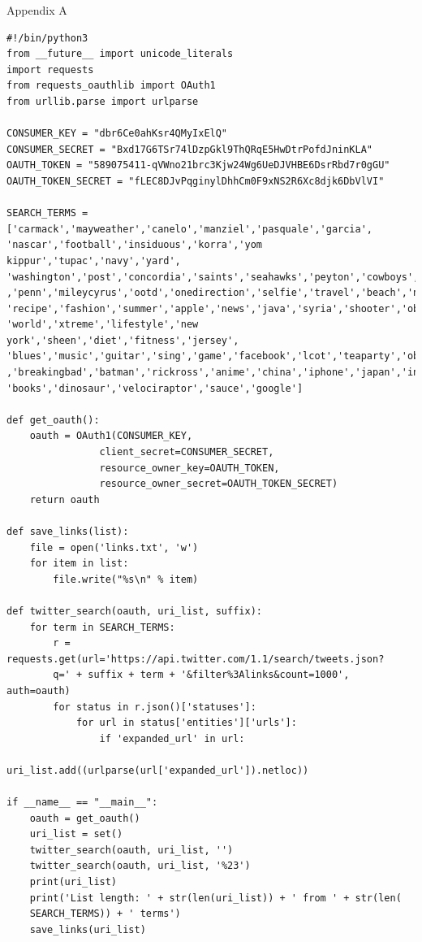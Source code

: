 \documentclass{article}
\begin{document}
\newpage
\appendix
Appendix A
\begin{verbatim}
#!/bin/python3
from __future__ import unicode_literals
import requests
from requests_oauthlib import OAuth1
from urllib.parse import urlparse

CONSUMER_KEY = "dbr6Ce0ahKsr4QMyIxElQ"
CONSUMER_SECRET = "Bxd17G6TSr74lDzpGkl9ThQRqE5HwDtrPofdJninKLA"
OAUTH_TOKEN = "589075411-qVWno21brc3Kjw24Wg6UeDJVHBE6DsrRbd7r0gGU"
OAUTH_TOKEN_SECRET = "fLEC8DJvPqginylDhhCm0F9xNS2R6Xc8djk6DbVlVI"

SEARCH_TERMS = ['carmack','mayweather','canelo','manziel','pasquale','garcia',
'nascar','football','insiduous','korra','yom kippur','tupac','navy','yard',
'washington','post','concordia','saints','seahawks','peyton','cowboys','eagles'
,'penn','mileycyrus','ootd','onedirection','selfie','travel','beach','nerd',
'recipe','fashion','summer','apple','news','java','syria','shooter','obama',
'world','xtreme','lifestyle','new york','sheen','diet','fitness','jersey',
'blues','music','guitar','sing','game','facebook','lcot','teaparty','obama2012'
,'breakingbad','batman','rickross','anime','china','iphone','japan','india',
'books','dinosaur','velociraptor','sauce','google']

def get_oauth():
    oauth = OAuth1(CONSUMER_KEY,
                client_secret=CONSUMER_SECRET,
                resource_owner_key=OAUTH_TOKEN,
                resource_owner_secret=OAUTH_TOKEN_SECRET)
    return oauth

def save_links(list):
    file = open('links.txt', 'w')
    for item in list:
        file.write("%s\n" % item)

def twitter_search(oauth, uri_list, suffix):
    for term in SEARCH_TERMS:
        r = requests.get(url='https://api.twitter.com/1.1/search/tweets.json?
		q=' + suffix + term + '&filter%3Alinks&count=1000', auth=oauth)
        for status in r.json()['statuses']:
            for url in status['entities']['urls']:
                if 'expanded_url' in url:
                    uri_list.add((urlparse(url['expanded_url']).netloc))

if __name__ == "__main__":
    oauth = get_oauth()
    uri_list = set()
    twitter_search(oauth, uri_list, '')
    twitter_search(oauth, uri_list, '%23')
    print(uri_list)
    print('List length: ' + str(len(uri_list)) + ' from ' + str(len(
	SEARCH_TERMS)) + ' terms')
    save_links(uri_list)
\end{verbatim}
\end{document}
